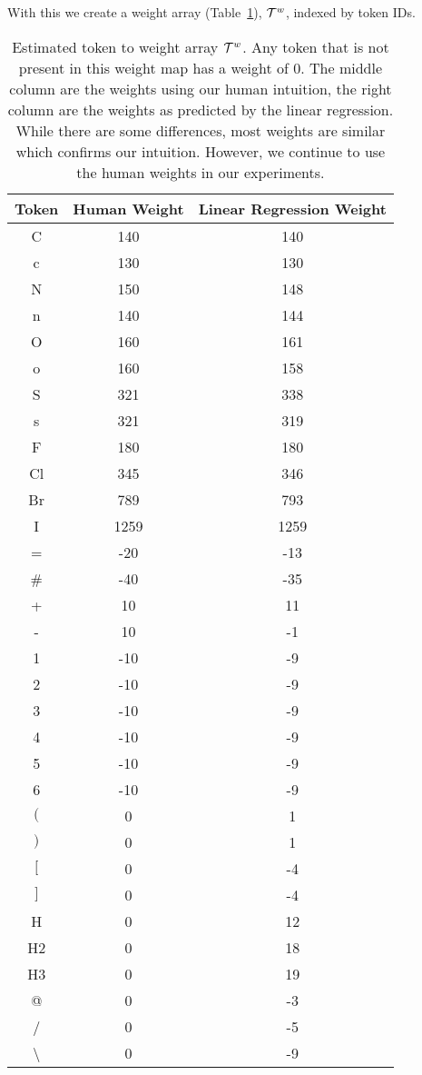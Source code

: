\documentclass[../Document.tex]{subfiles}
\begin{document}
With this we create a weight array (Table~\ref{tab:token-weight-map}), ${\cal T}^w$,  indexed by token IDs.

\begin{table}[H]
    \centering
    \begin{tabular}{c|c|c}
        Token & Human Weight & Linear Regression Weight\\
        \hline
        C & 140 & 140\\
        c & 130 & 130\\
        N & 150 & 148\\
        n & 140 & 144\\
        O & 160 & 161\\
        o & 160 & 158\\
        S & 321 & 338\\
        s & 321 & 319\\
        F & 180 & 180\\
        Cl & 345 & 346\\
        Br & 789 & 793\\
        I & 1259 & 1259\\
        = & -20 & -13\\
        \# & -40 & -35\\
        + & 10 & 11\\
        - & 10 & -1\\
        1 & -10 & -9\\
        2 & -10 & -9\\
        3 & -10 & -9\\
        4 & -10 & -9\\
        5 & -10 & -9\\
        6 & -10 & -9\\
        $($ & 0 & 1\\
        $)$ & 0 & 1\\
        $[$ & 0 & -4\\
        $]$ & 0 & -4\\
        H & 0 & 12\\
        H2 & 0 & 18\\
        H3 & 0 & 19\\
        @ & 0 & -3\\
        / & 0 & -5\\
        \textbackslash & 0 & -9
    \end{tabular}
    \caption[Estimated token to weight array ${\cal T}^w$]{Estimated token to weight array ${\cal T}^w$. Any token that is not present in this weight map has a weight of 0. The middle column are the weights using our human intuition, the right column are the weights as predicted by the linear regression. While there are some differences, most weights are similar which confirms our intuition. However, we continue to use the human weights in our experiments.}
    \label{tab:token-weight-map}
\end{table}
\end{document}
